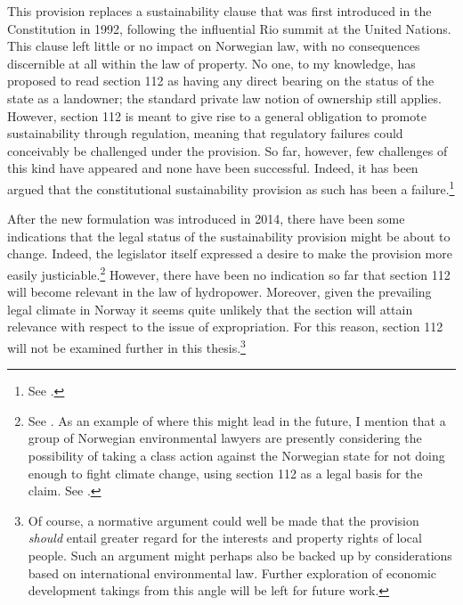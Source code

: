 This provision replaces a sustainability clause that was first introduced in the Constitution in 1992, following the influential Rio summit at the United Nations. This clause left little or no impact on Norwegian law, with no consequences discernible at all within the law of property. No one, to my knowledge, has proposed to read section 112 as having any direct bearing on the status of the state as a landowner; the standard private law notion of ownership still applies. However, section 112 is meant to give rise to a general obligation to promote sustainability through regulation, meaning that regulatory failures could conceivably be challenged under the provision. So far, however, few challenges of this kind have appeared and none have been successful. Indeed, it has been argued that the constitutional sustainability provision as such has been a failure.\footnote{See \cite{fauchald07}.}

After the new formulation was introduced in 2014, there have been some indications that the legal status of the sustainability provision might be about to change. Indeed, the legislator itself expressed a desire to make the provision more easily justiciable.\footnote{See \cite[246]{dok16}. As an example of where this might lead in the future, I mention that a group of Norwegian environmental lawyers are presently considering the possibility of taking a class action against  the Norwegian state for not doing enough to fight climate change, using section 112 as a legal basis for the claim. See \cite{gjengedal15}.} However, there have been no indication so far that section 112 will become relevant in the law of hydropower. Moreover, given the prevailing legal climate in Norway it seems quite unlikely that the section will attain relevance with respect to the issue of expropriation. For this reason, section 112 will not be examined further in this thesis.\footnote{Of course, a normative argument could well be made that the provision {\it should} entail greater regard for the interests and property rights of local people. Such an argument might perhaps also be backed up by considerations based on international environmental law. Further exploration of economic development takings from this angle will be left for future work.}

